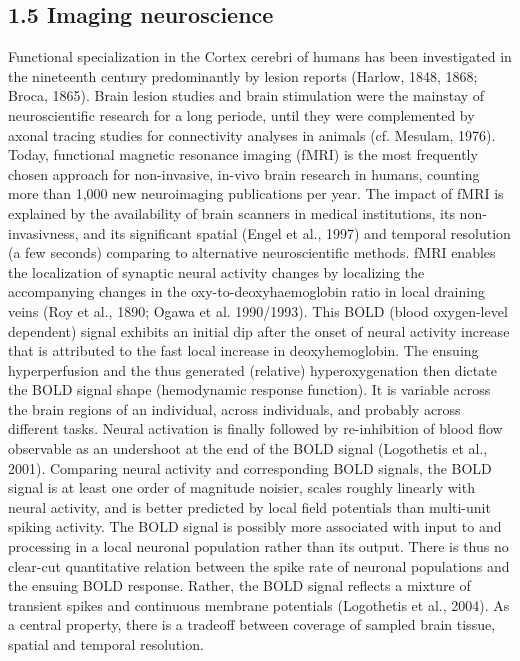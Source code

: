\documentclass[authoryear,review,3p]{elsarticle}
\begin{document}
\subsection*{1.5 Imaging neuroscience}

Functional specialization in the Cortex cerebri of humans has been
investigated in the nineteenth
century predominantly by lesion reports (Harlow, 1848, 1868; Broca, 1865).
Brain lesion studies and brain stimulation were the mainstay of
neuroscientific research for a long periode,
until they were complemented by
axonal tracing studies for connectivity analyses in
animals (cf. Mesulam, 1976).
%
Today, functional magnetic resonance imaging (fMRI)
is the most frequently chosen approach for non-invasive,
in-vivo brain research in humans,
counting more than 1,000 new neuroimaging publications per year.
The impact of fMRI is explained by the availability
of brain scanners in medical institutions,
its non-invasivness,
and its significant spatial (Engel et al., 1997)
and temporal resolution (a few seconds)
comparing to alternative neuroscientific methods.
%
fMRI enables the localization of synaptic neural activity changes by
localizing the accompanying changes in
the oxy-to-deoxyhaemoglobin ratio in local draining veins
(Roy et al., 1890; Ogawa et al. 1990/1993).
%
This BOLD (blood oxygen-level dependent) signal exhibits
an initial dip after the onset of neural activity
increase that is attributed to the fast local increase
in deoxyhemoglobin.
The ensuing hyperperfusion and the
thus generated (relative) hyperoxygenation then dictate
the BOLD signal shape (hemodynamic response function).
It is variable across the brain regions of an individual,
across individuals, and probably across different tasks.
Neural activation is finally followed by re-inhibition of
blood flow observable as an undershoot at the
end of the BOLD signal (Logothetis et al., 2001).
%
Comparing neural activity and corresponding BOLD signals,
the BOLD signal is at least one order of magnitude noisier,
scales roughly linearly with neural activity, and
is better predicted by local field potentials than
multi-unit spiking activity. The BOLD signal is possibly more associated
with input to and processing in a local neuronal population
rather than its output. There is thus no clear-cut quantitative relation
between the spike rate of neuronal populations and the ensuing
BOLD response. Rather, the BOLD signal reflects a mixture of
transient spikes and continuous membrane potentials (Logothetis et al., 2004).
%
As a central property, there is a tradeoff between
coverage of sampled brain tissue, spatial and temporal resolution. 
\end{document}

